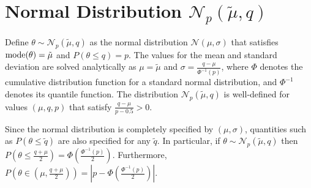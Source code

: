 \documentclass[useAMS,usenatbib]{biom}
\begin{document}






\label{firstpage}

\section*{Normal Distribution $\mathcal{N}_p(\tilde{\mu},q)$}

Define $\theta\sim\mathcal{N}_p(\tilde{\mu},q)$ as the normal distribution $\mathcal{N}(\mu,\sigma)$ that satisfies ${\mathrm{mode}}(\theta)=\tilde{\mu}$ and $P(\theta\leq q)=p$.
%
The values for the mean and standard deviation are solved analytically as $\mu=\tilde{\mu}$ and $\sigma=\frac{q-\mu}{\Phi^{-1}(p)}$, where $\Phi$ denotes the cumulative distribution function for a standard normal distribution, and $\Phi^{-1}$ denotes its quantile function. The distribution $\mathcal{N}_p(\tilde{\mu},q)$ is well-defined for values $(\mu,q,p)$ that satisfy $\frac{q-\mu}{p-0.5}>0$.


 Since the normal distribution is completely specified by $(\mu, \sigma)$, quantities such as $P(\theta\leq\tilde{q})$ are also specified for any $\tilde{q}$. In particular, if $\theta\sim\mathcal{N}_p(\tilde{\mu},q)$ then $P(\theta\leq\frac{q+\mu}{2})=\Phi(\frac{\Phi^{-1}(p)}{2})$. Furthermore, $P(\theta\in(\mu,\frac{q+\mu}{2}))=|p-\Phi(\frac{\Phi^{-1}(p)}{2})|$. 
\end{document}
